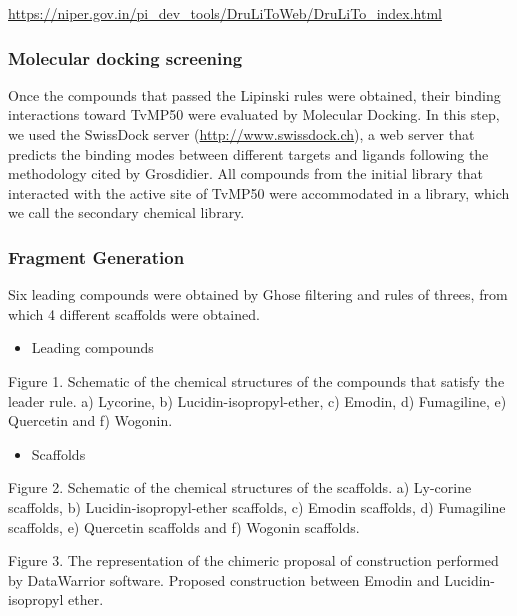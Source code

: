 \documentclass[
]{article}
\providecommand{\tightlist}{%
  \setlength{\itemsep}{0pt}\setlength{\parskip}{0pt}}
\begin{document}
\url{https://niper.gov.in/pi_dev_tools/DruLiToWeb/DruLiTo_index.html}

\hypertarget{molecular-docking-screening}{%
\subsubsection{Molecular docking
screening}\label{molecular-docking-screening}}

Once the compounds that passed the Lipinski rules were obtained, their
binding interactions toward TvMP50 were evaluated by Molecular Docking.
In this step, we used the SwissDock server
(\url{http://www.swissdock.ch}), a web server that predicts the binding
modes between different targets and ligands following the methodology
cited by Grosdidier. All compounds from the initial library that
interacted with the active site of TvMP50 were accommodated in a
library, which we call the secondary chemical library.

\hypertarget{fragment-generation}{%
\subsubsection{Fragment Generation}\label{fragment-generation}}

Six leading compounds were obtained by Ghose filtering and rules of
threes, from which 4 different scaffolds were obtained.

\begin{itemize}
\tightlist
\item
  Leading compounds
\end{itemize}

Figure 1. Schematic of the chemical structures of the compounds that
satisfy the leader rule. a) Lycorine, b) Lucidin-isopropyl-ether, c)
Emodin, d) Fumagiline, e) Quercetin and f) Wogonin.

\begin{itemize}
\tightlist
\item
  Scaffolds
\end{itemize}

Figure 2. Schematic of the chemical structures of the scaffolds. a)
Ly-corine scaffolds, b) Lucidin-isopropyl-ether scaffolds, c) Emodin
scaffolds, d) Fumagiline scaffolds, e) Quercetin scaffolds and f)
Wogonin scaffolds.

Figure 3. The representation of the chimeric proposal of construction
performed by DataWarrior software. Proposed construction between Emodin
and Lucidin-isopropyl ether.
\end{document}
